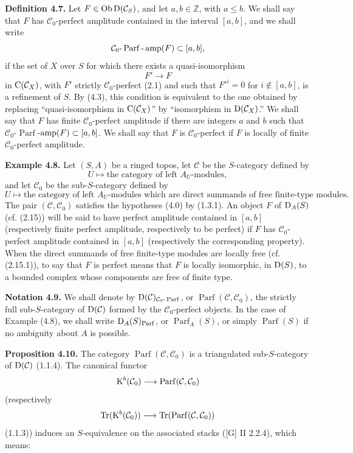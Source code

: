 \documentclass[11pt]{article}
\newcommand{\Parf}{\operatorname{Parf}}
\begin{document}
\textbf{Definition 4.7.} Let \(F\in\operatorname{Ob}\mathrm D(\mathcal C_S)\), and let \(a,b\in\mathbb Z\), with \(a\leq b\). We shall say that \(F\) has \(\mathcal C_0\)-perfect amplitude contained in the interval \([a,b]\), and we shall write
\[
  \mathcal C_0\text{-}\Parf\text{-}\amp(F)\subset[a,b],
\]
if the set of \(X\) over \(S\) for which there exists a quasi-isomorphism
\[
  F'\longrightarrow F
\]
in \(\mathrm C(\mathcal C_X)\), with \(F'\) strictly \(\mathcal C_0\)-perfect (2.1) and such that \(F'^i=0\) for \(i\notin[a,b]\), is a refinement of \(S\). By (4.3), this condition is equivalent to the one obtained by replacing ``quasi-isomorphism in \(\mathrm C(\mathcal C_X)\)'' by ``isomorphism in \(\mathrm D(\mathcal C_X)\).'' We shall say that \(F\) has finite \(\mathcal C_0\)-perfect amplitude if there are integers \(a\) and \(b\) such that \(\mathcal C_0\)-\(\Parf\)-\(\operatorname{amp}(F)\subset[a,b]\). We shall say that \(F\) is \(\mathcal C_0\)-perfect if \(F\) is locally of finite \(\mathcal C_0\)-perfect amplitude.

\textbf{Example 4.8.} Let \((S,A)\) be a ringed topos, let \(\mathcal C\) be the \(S\)-category defined by
\[
  U\longmapsto \text{the category of left }A_U\text{-modules},
\]
and let \(\mathcal C_0\) be the sub-\(S\)-category defined by
\[
  U\longmapsto \text{the category of left }A_U\text{-modules which are direct summands of free finite-type modules}.
\]
The pair \((\mathcal C,\mathcal C_0)\) satisfies the hypotheses (4.0) by (1.3.1). An object \(F\) of \(\mathrm D_A(S)\) (cf. (2.15)) will be said to have perfect amplitude contained in \([a,b]\) (respectively finite perfect amplitude, respectively to be perfect) if \(F\) has \(\mathcal C_0\)-perfect amplitude contained in \([a,b]\) (respectively the corresponding property). When the direct summands of free finite-type modules are locally free (cf. (2.15.1)), to say that \(F\) is perfect means that \(F\) is locally isomorphic, in \(\mathrm D(S)\), to a bounded complex whose components are free of finite type.

\textbf{Notation 4.9.} We shall denote by \(\Dpx(\mathcal C)_{\mathcal C_0\text{-}\Parf}\), or \(\Parf(\mathcal C,\mathcal C_0)\), the strictly full sub-\(S\)-category of \(\mathrm D(\mathcal C)\) formed by the \(\mathcal C_0\)-perfect objects. In the case of Example (4.8), we shall write \(\Dpx_A(S)_{\Parf}\), or \(\Parf_A(S)\), or simply \(\Parf(S)\) if no ambiguity about \(A\) is possible.

\textbf{Proposition 4.10.} The category \(\Parf(\mathcal C,\mathcal C_0)\) is a triangulated sub-\(S\)-category of \(\mathrm D(\mathcal C)\) (1.1.4). The canonical functor
\[
  \Kpx^b(\mathcal C_0)\longrightarrow \Parf(\mathcal C,\mathcal C_0)
\]
(respectively
\[
  \Tr(\Kpx^b(\mathcal C_0))\longrightarrow \Tr(\Parf(\mathcal C,\mathcal C_0))
\]
(1.1.3)) induces an \(S\)-equivalence on the associated stacks ([G] II 2.2.4), which means:
\end{document}
